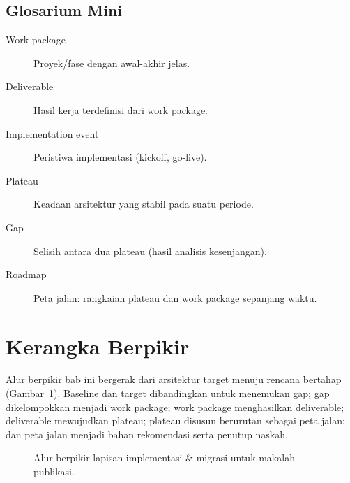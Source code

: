 \subsection*{Glosarium Mini}
\begin{description}
  \item[Work package] Proyek/fase dengan awal-akhir jelas.
  \item[Deliverable] Hasil kerja terdefinisi dari work package.
  \item[Implementation event] Peristiwa implementasi (kickoff, go-live).
  \item[Plateau] Keadaan arsitektur yang stabil pada suatu periode.
  \item[Gap] Selisih antara dua plateau (hasil analisis kesenjangan).
  \item[Roadmap] Peta jalan: rangkaian plateau dan work package sepanjang waktu.
\end{description}

\section{Kerangka Berpikir}

Alur berpikir bab ini bergerak dari arsitektur target menuju rencana bertahap
(Gambar~\ref{fig:impl-flow}). Baseline dan target dibandingkan untuk menemukan
gap; gap dikelompokkan menjadi work package; work package menghasilkan deliverable;
deliverable mewujudkan plateau; plateau disusun berurutan sebagai peta jalan; dan
peta jalan menjadi bahan rekomendasi serta penutup naskah.

\begin{figure}[htbp]
\centering
{}
\caption{Alur berpikir lapisan implementasi \& migrasi untuk makalah publikasi.}
\label{fig:impl-flow}
\end{figure}

